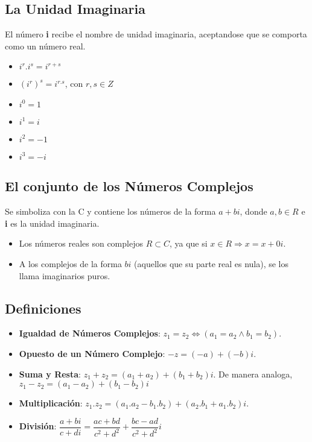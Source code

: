 \documentclass[10pt]{article}
\begin{document}
\subsection{La Unidad Imaginaria}
El número \textbf{i} recibe el nombre de unidad imaginaria, aceptandose que se comporta como un número real.
\begin{multicols}{3}
\begin{itemize}
\item $i^r.i^s = i^{r+s}$
\item $(i^r)^s = i^{r.s}$, con $r,s \in Z$
\item $i^0 = 1$
\item $i^1 = i$
\item $i^2 = -1$
\item $i^3 = -i$
\end{itemize}
\end{multicols}
\begin{center}
\end{center}
\subsection{El conjunto de los Números Complejos}
Se simboliza con la C y contiene los números de la forma $a+bi$, donde $a,b \in R$ e \textbf{i} es la unidad imaginaria.
\begin{center}
\end{center}
\begin{itemize}
\item Los números reales son complejos $R \subset C$, ya que si $x \in R \Rightarrow x = x+0i$.
\item A los complejos de la forma $bi$ (aquellos que su parte real es nula), se los llama imaginarios puros.
\end{itemize}
\subsection{Definiciones}
\begin{itemize}
\item \textbf{Igualdad de Números Complejos}: $z_1=z_2 \iff (a_1=a_2 \land b_1=b_2)$.
\item \textbf{Opuesto de un Número Complejo}: $-z=(-a)+(-b)i$.
\item \textbf{Suma y Resta}: $z_1+z_2 = (a_1+a_2)+(b_1+b_2)i$. De manera analoga, $z_1-z_2 = (a_1-a_2)+(b_1-b_2)i$
\item \textbf{Multiplicación}: $z_1.z_2 = (a_1.a_2-b_1.b_2) + (a_2.b_1+a_1.b_2)i$.
\item \textbf{División}: $\dfrac{a+bi}{c+di} = \dfrac{ac+bd}{c^2+d^2}+\dfrac{bc-ad}{c^2+d^2}i$
\end{itemize}
\end{document}

